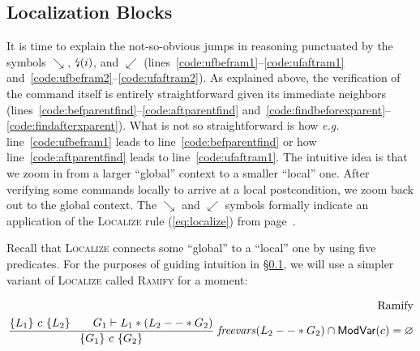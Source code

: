\subsection{Localization Blocks}
\label{sec:localblocks}

It is time to explain the not-so-obvious jumps in reasoning punctuated by the symbols $\searrow$, $\mbox{\lightning}(i)$, and $\swarrow$ (lines~\ref{code:ufbefram1}--\ref{code:ufaftram1} and~\ref{code:ufbefram2}--\ref{code:ufaftram2}).  {\color{magenta}As explained above, the verification of the command itself is entirely straightforward given its immediate neighbors (lines~\ref{code:befparentfind}--\ref{code:aftparentfind} and~\ref{code:findbeforexparent}--\ref{code:findafterxparent}).  What is not so straightforward is how \emph{e.g.} line~\ref{code:ufbefram1} leads to line~\ref{code:befparentfind} or how line~\ref{code:aftparentfind} leads to line~\ref{code:ufaftram1}.} The intuitive idea is that we zoom in from a larger ``global'' context to a smaller ``local'' one.  After verifying some commands locally to arrive at a local postcondition, we zoom back out to the global context.  The $\searrow$ and $\swarrow$ symbols formally indicate an application of the \textsc{Localize} rule (\ref{eq:localize}) from page~\pageref{eq:localize}.

{\color{magenta}Recall that \textsc{Localize} connects some ``global'' to a ``local'' one by using five predicates.  For the purposes of guiding intuition in \S\ref{sec:localblocks}, we will use a simpler variant of \textsc{Localize} called \textsc{Ramify} for a moment:}

\begin{equation}
\label{eq:ramify}
\begin{split}
\text{Ramify} \\	
\frac
{\{ L_1 \} ~ c ~ \{ L_2 \} \qquad
G_1 |- L_1 * (L_2 --* G_2)}
{\{ G_1 \} ~ c ~ \{ G_2 \}} 
\;{\mathit{freevars}(L_2 --* G_2) \cap \mathsf{ModVar}(c) = \varnothing}
\end{split}
\end{equation}

\hide{ %
\begin{equation}
\label{eq:ramify}
\begin{array}{@{}l@{}}
\infrule{}%
{\{ L_1 \} ~ c ~ \{ L_2 \} \\
G_1 |- L_1 * (L_2 --* G_2)}
{\{ G_1 \} ~ c ~ \{ G_2 \}} {(\ddagger)} \\
[3pt]
(\ddagger)~ \mathit{freevars}(L_2 --* G_2) \cap \MV(c) = \emptyset
\end{array}
\end{equation}
} %

